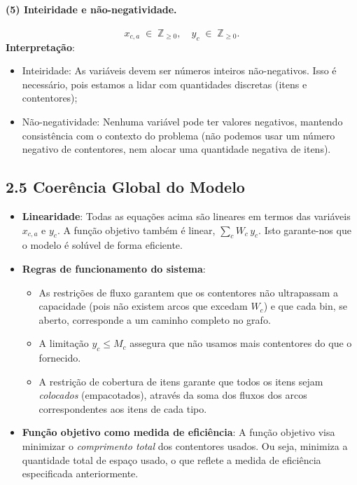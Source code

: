 \documentclass[a4paper,12pt]{article}
\begin{document}
\paragraph{(5) Inteiridade e não-negatividade.}
\[
x_{c,a} \;\in\; \mathbb{Z}_{\ge 0}, 
\quad
y_c \;\in\; \mathbb{Z}_{\ge 0}.
\]
\noindent
\textbf{Interpretação}:
\begin{itemize}
    \item Inteiridade: As variáveis devem ser números inteiros não-negativos. Isso é necessário, pois estamos a lidar com quantidades discretas (itens e contentores);
    \item Não-negatividade: Nenhuma variável pode ter valores negativos, mantendo consistência com o contexto do problema (não podemos usar um número negativo de contentores, nem alocar uma quantidade negativa de itens).
\end{itemize}

\subsection*{2.5 Coerência Global do Modelo}

\begin{itemize}
  \item \textbf{Linearidade}: Todas as equações acima são lineares em termos das variáveis $x_{c,a}$ e $y_c$. A função objetivo também é linear, $\sum_c W_c\,y_c$. Isto garante-nos que o modelo é solúvel de forma eficiente.
  \item \textbf{Regras de funcionamento do sistema}: 
    \begin{itemize}
      \item As restrições de fluxo garantem que os contentores não ultrapassam a capacidade (pois não existem arcos que excedam $W_c$) e que cada bin, se aberto, corresponde a um caminho completo no grafo.
      \item A limitação $y_c \le M_c$ assegura que não usamos mais contentores do que o fornecido.
      \item A restrição de cobertura de itens garante que todos os itens sejam \emph{colocados} (empacotados), através da soma dos fluxos dos arcos correspondentes aos itens de cada tipo.
    \end{itemize}
  \item \textbf{Função objetivo como medida de eficiência}: A função objetivo visa minimizar o \emph{comprimento total} dos contentores usados. Ou seja, minimiza a quantidade total de espaço usado, o que reflete a medida de eficiência especificada anteriormente.
\end{itemize}
\end{document}
